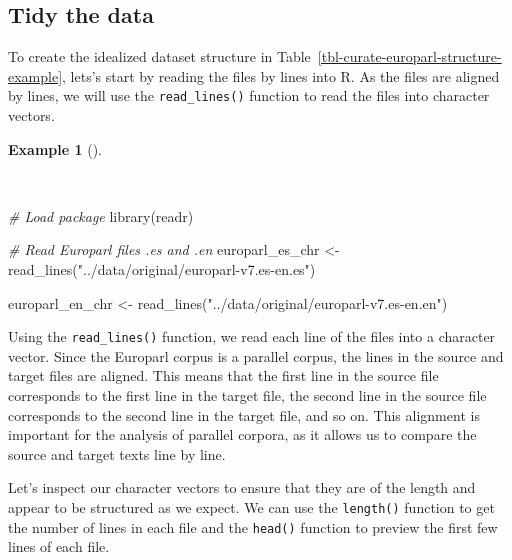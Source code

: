 \documentclass[
  letterpaper,
]{book}
\newenvironment{Shaded}{\begin{snugshade}}{\end{snugshade}}
\newcommand{\CommentTok}[1]{\textcolor[rgb]{0.00,0.00,0.00}{\textit{#1}}}
\newcommand{\FunctionTok}[1]{\textcolor[rgb]{0.00,0.00,0.00}{#1}}
\newcommand{\NormalTok}[1]{\textcolor[rgb]{0.00,0.00,0.00}{#1}}
\newcommand{\OtherTok}[1]{\textcolor[rgb]{0.00,0.00,0.00}{#1}}
\newcommand{\StringTok}[1]{\textcolor[rgb]{0.00,0.00,0.00}{#1}}
\theoremstyle{definition}
\newtheorem{example}{Example}[chapter]
\theoremstyle{remark}
\begin{document}
\subsection{Tidy the data}\label{tidy-the-data}

To create the idealized dataset structure in
Table~\ref{tbl-curate-europarl-structure-example}, lets's start by
reading the files by lines into R. As the files are aligned by lines, we
will use the \texttt{read\_lines()} function to read the files into
character vectors.

\begin{example}[]\protect\hypertarget{exm-curate-europarl-readr}{}\label{exm-curate-europarl-readr}

~

\begin{Shaded}
\begin{Highlighting}[]
\CommentTok{\# Load package}
\FunctionTok{library}\NormalTok{(readr)}

\CommentTok{\# Read Europarl files .es and .en}
\NormalTok{europarl\_es\_chr }\OtherTok{\textless{}{-}}
  \FunctionTok{read\_lines}\NormalTok{(}\StringTok{"../data/original/europarl{-}v7.es{-}en.es"}\NormalTok{)}

\NormalTok{europarl\_en\_chr }\OtherTok{\textless{}{-}}
  \FunctionTok{read\_lines}\NormalTok{(}\StringTok{"../data/original/europarl{-}v7.es{-}en.en"}\NormalTok{)}
\end{Highlighting}
\end{Shaded}

\end{example}

Using the \texttt{read\_lines()} function, we read each line of the
files into a character vector. Since the Europarl corpus is a parallel
corpus, the lines in the source and target files are aligned. This means
that the first line in the source file corresponds to the first line in
the target file, the second line in the source file corresponds to the
second line in the target file, and so on. This alignment is important
for the analysis of parallel corpora, as it allows us to compare the
source and target texts line by line.

Let's inspect our character vectors to ensure that they are of the
length and appear to be structured as we expect. We can use the
\texttt{length()} function to get the number of lines in each file and
the \texttt{head()} function to preview the first few lines of each
file.
\end{document}
